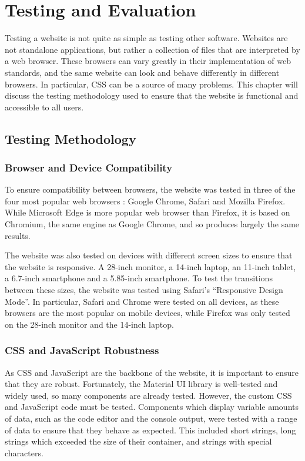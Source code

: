 \documentclass[../main.tex]{subfiles}
\begin{document}
\chapter{Testing and Evaluation} \label{ch:evaluation}
    Testing a website is not quite as simple as testing other software.
    Websites are not standalone applications, but rather a collection of files that
        are interpreted by a web browser.
    These browsers can vary greatly in their implementation of web standards, and
        the same website can look and behave differently in different browsers.
    In particular, CSS can be a source of many problems.
    This chapter will discuss the testing methodology used to ensure that the
        website is functional and accessible to all users.

    \section{Testing Methodology}
        \subsection{Browser and Device Compatibility}
            To ensure compatibility between browsers, the website was tested in three of
                the four most popular web browsers \citep{browsers}: Google Chrome, Safari and
                Mozilla Firefox.
            While Microsoft Edge is more popular web browser than Firefox, it is based on
                Chromium, the same engine as Google Chrome, and so produces largely the same
                results.

            The website was also tested on devices with different screen sizes to ensure
                that the website is responsive.
            A 28-inch monitor, a 14-inch laptop, an 11-inch tablet, a 6.7-inch smartphone
                and a 5.85-inch smartphone.
            To test the transitions between these sizes, the website was tested using
                Safari's ``Responsive Design Mode''.
            In particular, Safari and Chrome were tested on all devices, as these browsers
                are the most popular on mobile devices, while Firefox was only tested on the
                28-inch monitor and the 14-inch laptop.

        \subsection{CSS and JavaScript Robustness}
            As CSS and JavaScript are the backbone of the website, it is important to
                ensure that they are robust.
            Fortunately, the Material UI library is well-tested and widely used, so many
                components are already tested.
            However, the custom CSS and JavaScript code must be tested.
            Components which display variable amounts of data, such as the code editor and
                the console output, were tested with a range of data to ensure that they behave
                as expected.
            This included short strings, long strings which exceeded the size of their
                container, and strings with special characters.
\end{document}
